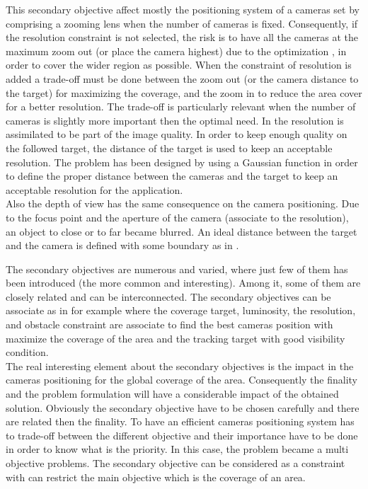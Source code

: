 \begin{itemize}
  This secondary objective affect mostly the positioning system of a cameras set by comprising a zooming lens when the  number of cameras is fixed. Consequently, if the resolution constraint is not selected, the risk is to have all the cameras at the maximum zoom out (or place the camera highest) due to the optimization , in order to cover the wider region as possible. When the constraint of resolution is added a trade-off must be done between the zoom out (or the camera distance to the target) for maximizing the coverage, and the zoom in to reduce the area cover for a better resolution. The trade-off is particularly relevant when the number of cameras is slightly more important then the optimal need.
   In \cite{33*reddy2012} the resolution is assimilated to be part of the image quality. In order to keep enough quality on the followed target, the distance of the target is used to keep an acceptable resolution. The problem has been designed by using a Gaussian function in order to define the proper distance between the cameras and the target to keep an acceptable resolution for the application. \\
Also the depth of view has the same consequence on the camera positioning. Due to the focus point and the aperture of the camera (associate to the resolution), an object to close or to far became blurred. An ideal distance between the target and the camera is defined with some boundary as in \cite{193*fu2014}. %

\end{itemize}

The secondary objectives are numerous and varied, where just few of them has been introduced (the more common and interesting). Among it, some of them are closely related and can be interconnected. The secondary objectives can be associate as in \cite{33*reddy2012} for example where the coverage target, luminosity, the resolution, and obstacle constraint are associate to find the best cameras position with maximize the coverage of the area and the  tracking target with good visibility condition. \\
The real interesting element about the secondary objectives is the impact in the cameras positioning for the global coverage of the area. Consequently the finality and the problem formulation will have a considerable impact of the obtained solution. Obviously the secondary objective have to be chosen carefully and there are related then the finality. To have an efficient cameras positioning system has to trade-off between the different objective and their importance have to be done in order to know what is the priority. In this case, the problem became a multi objective problems. 
The secondary objective can be considered as a constraint with can restrict the main objective which is the coverage of an area.


